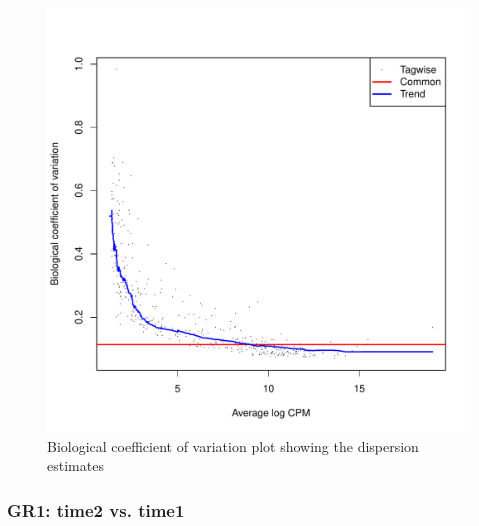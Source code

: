 \documentclass[12pt]{article}
\begin{document}
\begin{figure}[H]
\begin{center}
\includegraphics{9999_report-fig4}
\end{center}
\caption{Biological coefficient of variation plot showing the dispersion estimates}
\end{figure} 


\subsubsection{GR1: time2 vs. time1}
\end{document}
